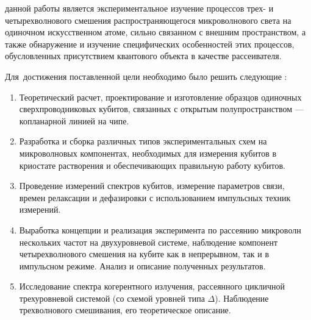 
{\aim} данной работы является экспериментальное изучение процессов трех- и четырехволнового смешения распространяющегося микроволнового света на одиночном искусственном атоме, сильно связанном с внешним пространством, а также обнаружение и изучение специфических особенностей этих процессов, обусловленных присутствием квантового объекта в качестве рассеивателя.

Для~достижения поставленной цели необходимо было решить следующие {\tasks}:
\begin{enumerate}
	\item Теоретический расчет, проектирование и изготовление образцов одиночных сверхпроводниковых кубитов, связанных с открытым полупространством --- копланарной линией на чипе.
	\item Разработка и сборка различных типов экспериментальных схем на микроволновых компонентах, необходимых для измерения кубитов в криостате растворения и обеспечивающих правильную работу кубитов.
	\item Проведение измерений спектров кубитов, измерение параметров связи, времен релаксации и дефазировки с использованием импульсных техник измерений.
	\item Выработка концепции и реализация эксперимента по рассеянию микроволн нескольких частот на двухуровневой системе, наблюдение компонент четырехволнового смешения на кубите как в непрерывном, так и в импульсном режиме. Анализ и описание полученных результатов.
	\item Исследование спектра когерентного излучения, рассеянного цикличной трехуровневой системой (со схемой уровней типа $\Delta$). Наблюдение трехволнового смешивания, его теоретическое описание.
	
\end{enumerate}


